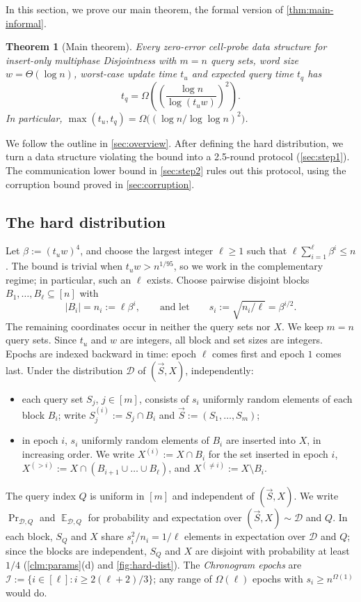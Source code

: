 \documentclass[11pt]{article}
\theoremstyle{plain}
\newtheorem{theorem}{Theorem}[section]
\theoremstyle{definition}
\theoremstyle{remark}
\newcommand{\E}{\mathop{\mathbb{E}}}
\newcommand{\abs}[1]{\left|#1\right|}
\newcommand{\cI}{\mathcal{I}}
\newcommand{\cD}{\mathcal{D}}
\newcommand{\vS}{\vec{S}}
\begin{document}
In this section, we prove our main theorem, the formal version of \cref{thm:main-informal}.

\begin{theorem}[Main theorem]\label{thm:main}
Every zero-error cell-probe data structure for insert-only multiphase Disjointness with $m = n$ query sets, word size $w = \Theta(\log n)$, worst-case update time $t_u$ and expected query time $t_q$ has
\[ t_q = \Omega\!\left(\left(\frac{\log n}{\log(t_u w)}\right)^{2}\right). \]
In particular, $\max(t_u,t_q)=\Omega\big((\log n/\log\log n)^2\big)$.
\end{theorem}

We follow the outline in \cref{sec:overview}. After defining the hard distribution, we turn a data structure violating the bound into a 2.5-round protocol (\cref{sec:step1}). The communication lower bound in \cref{sec:step2} rules out this protocol, using the corruption bound proved in \cref{sec:corruption}.

\subsection{The hard distribution}\label{sec:dist}

Let $\beta := (t_u w)^4$, and choose the largest integer $\ell\ge1$ such that $\ell\sum_{i=1}^{\ell}\beta^i\le n$. The bound is trivial when $t_u w>n^{1/95}$, so we work in the complementary regime; in particular, such an $\ell$ exists. Choose pairwise disjoint blocks $B_1,\dots,B_\ell\subseteq[n]$ with
\[ \abs{B_i} = n_i := \ell\beta^i, \qquad\text{and let}\qquad s_i := \sqrt{n_i/\ell} = \beta^{i/2}. \]
The remaining coordinates occur in neither the query sets nor $X$. We keep $m=n$ query sets. Since $t_u$ and $w$ are integers, all block and set sizes are integers.
Epochs are indexed backward in time: epoch $\ell$ comes first and epoch $1$ comes last. Under the distribution $\cD$ of $(\vS, X)$, independently:
\begin{itemize}[leftmargin=*]
  \item each query set $S_j$, $j \in [m]$, consists of $s_i$ uniformly random elements of each block $B_i$; write $S_j^{(i)} := S_j \cap B_i$ and $\vS := (S_1,\dots,S_m)$;
  \item in epoch $i$, $s_i$ uniformly random elements of $B_i$ are inserted into $X$, in increasing order. We write $X^{(i)} := X \cap B_i$ for the set inserted in epoch $i$, $X^{(>i)} := X \cap (B_{i+1} \cup \dots \cup B_\ell)$, and $X^{(\ne i)} := X \setminus B_i$.
\end{itemize}
The query index $Q$ is uniform in $[m]$ and independent of $(\vS, X)$. We write $\Pr_{\cD,Q}$ and $\E_{\cD,Q}$ for probability and expectation over $(\vS, X) \sim \cD$ and $Q$.
In each block, $S_Q$ and $X$ share $s_i^2/n_i = 1/\ell$ elements in expectation over $\cD$ and $Q$; since the blocks are independent, $S_Q$ and $X$ are disjoint with probability at least $1/4$ (\cref{clm:params}(d) and \cref{fig:hard-dist}). The \emph{Chronogram epochs} are $\cI := \{ i \in [\ell] : i \ge 2(\ell+2)/3 \}$; any range of $\Omega(\ell)$ epochs with $s_i \ge n^{\Omega(1)}$ would do.
\end{document}

